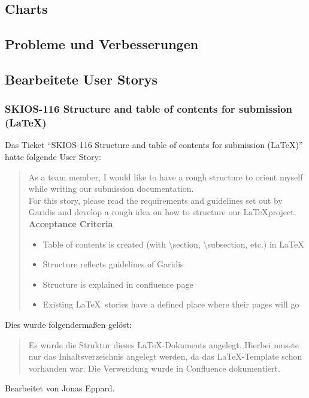 \subsection{Charts}
\subsection{Probleme und Verbesserungen}

\subsection{Bearbeitete User Storys}
\subsubsection{SKIOS-116 Structure and table of contents for submission (\LaTeX)}
Das Ticket \enquote{SKIOS-116 Structure and table of contents for submission (\LaTeX)}
hatte folgende User Story:
\begin{quotation}
    As a team member, I would like to have a rough structure to orient myself while writing our submission documentation.\\
    For this story, please read the requirements and guidelines set out by Garidis and develop a rough idea on how to structure our \LaTeX project.\\
    \textbf{Acceptance Criteria}
    \begin{itemize}
        \item Table of contents is created (with \textbackslash{}section, \textbackslash{}subsection, etc.) in \LaTeX
        \item Structure reflects guidelines of Garidis
        \item Structure is explained in confluence page
        \item Existing \LaTeX~stories have a defined place where their pages will go
    \end{itemize}
\end{quotation}
Dies wurde folgendermaßen gelöst:
\begin{quotation}
    Es wurde die Struktur dieses \LaTeX-Dokuments angelegt. Hierbei musste nur das Inhaltsverzeichnis
    angelegt werden, da das \LaTeX-Template schon vorhanden war.
    Die Verwendung wurde in Confluence dokumentiert.
\end{quotation}
Bearbeitet von Jonas Eppard.


